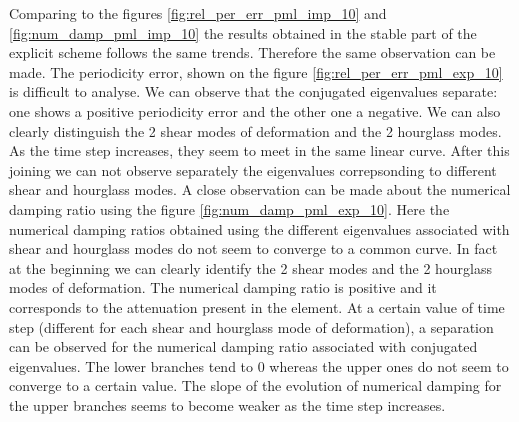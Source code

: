 \begin{itemize}
Comparing to the figures \ref{fig:rel_per_err_pml_imp_10} and \ref{fig:num_damp_pml_imp_10} the results obtained in the stable part of the explicit scheme follows the same trends. Therefore the same observation can be made. The periodicity error, shown on the figure \ref{fig:rel_per_err_pml_exp_10} is difficult to analyse. We can observe that the conjugated eigenvalues separate: one shows a positive periodicity error and the other one a negative. We can also clearly distinguish the 2 shear modes of deformation and the 2 hourglass modes. As the time step increases, they seem to meet in the same linear curve. After this joining we can not observe separately the eigenvalues correpsonding to different shear and hourglass modes. A close observation can be made about the numerical damping ratio using the figure \ref{fig:num_damp_pml_exp_10}. Here the numerical damping ratios obtained using the different eigenvalues associated with shear and hourglass modes do not seem to converge to a common curve. In fact at the beginning we can clearly identify the 2 shear modes and the 2 hourglass modes of deformation. The numerical damping ratio is positive and it corresponds to the attenuation present in the element. At a certain value of time step (different for each shear and hourglass mode of deformation), a separation can be observed for the numerical damping ratio associated with conjugated eigenvalues. The lower branches tend to $0$ whereas the upper ones do not seem to converge to a certain value. The slope of the evolution of numerical damping for the upper branches seems to become weaker as the time step increases.      
\end{itemize} 
